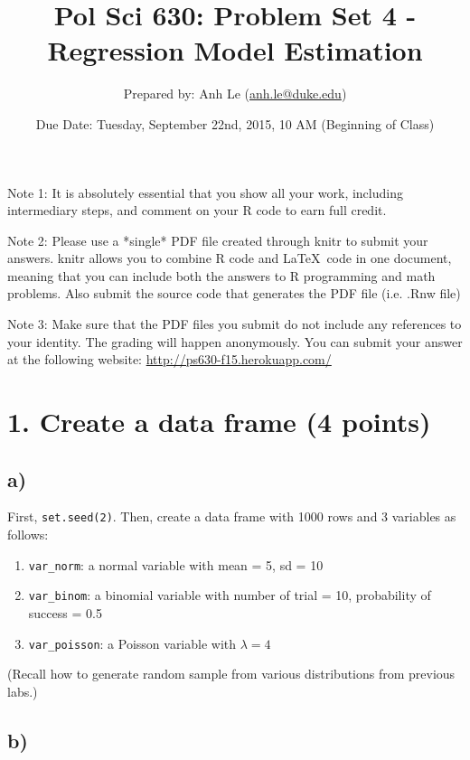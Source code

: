 \documentclass{article}\usepackage[]{graphicx}\usepackage[]{color}
\begin{document}
\title{Pol Sci 630: Problem Set 4 - Regression Model Estimation}

\author{Prepared by: Anh Le (\href{mailto:anh.le@duke.edu}{anh.le@duke.edu})}

\date{Due Date: Tuesday, September 22nd, 2015, 10 AM (Beginning of Class)}

\maketitle

Note 1: It is absolutely essential that you show all your work, including intermediary steps, and comment on your R code to earn full credit.

Note 2: Please use a *single* PDF file created through knitr to submit your answers. knitr allows you to combine R code and \LaTeX \ code in one document, meaning that you can include both the answers to R programming and math problems. Also submit the source code that generates the PDF file (i.e. .Rnw file)

Note 3: Make sure that the PDF files you submit do not include any references to your identity. The grading will happen anonymously. You can submit your answer at the following website: \url{http://ps630-f15.herokuapp.com/}

\section*{1. Create a data frame (4 points)}

\subsection*{a)}
First, \verb`set.seed(2)`. Then, create a data frame with 1000 rows and 3 variables as follows:
\begin{enumerate}
\item \verb`var_norm`: a normal variable with mean = 5, sd = 10
\item \verb`var_binom`: a binomial variable with number of trial = 10, probability of success = 0.5
\item \verb`var_poisson`: a Poisson variable with $\lambda = 4$
\end{enumerate}

(Recall how to generate random sample from various distributions from previous labs.)

\subsection*{b)}
\end{document}

